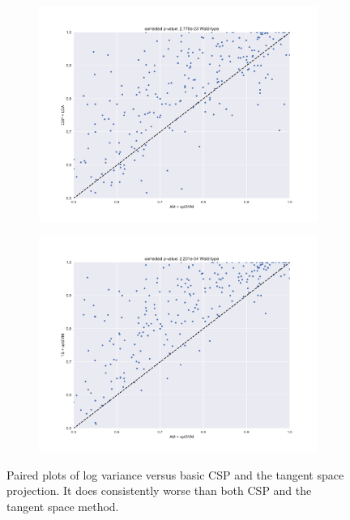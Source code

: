 \begin{figure}
    \centering
    \begin{subfigure}[t]{0.5\textwidth}
        \centering
        \includegraphics[width=\textwidth]{Figures/AM1.pdf}
    \end{subfigure}%
     
    \begin{subfigure}[h]{0.5\textwidth}
        \includegraphics[width=\textwidth]{Figures/AM2.pdf}
    \end{subfigure}
    
    \caption{Paired plots of log variance versus basic CSP and the
      tangent space projection. It does
      consistently worse than both CSP and the tangent space method.}
    \label{fig:am}
\end{figure}
